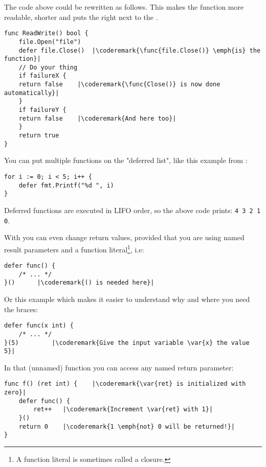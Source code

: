 The code above could be rewritten as follows. This makes the 
function more readable, shorter and puts the  right next 
to the .
\begin{lstlisting}[caption=With defer]
func ReadWrite() bool {
    file.Open("file")
    defer file.Close()	|\coderemark{\func{file.Close()} \emph{is} the function}|
    // Do your thing
    if failureX {
	return false    |\coderemark{\func{Close()} is now done automatically}|
    }
    if failureY {
	return false    |\coderemark{And here too}|
    }
    return true
}
\end{lstlisting}
You can put multiple functions on the "deferred list", like this
example from \cite{effective_go}:
\begin{lstlisting}
for i := 0; i < 5; i++ { 
    defer fmt.Printf("%d ", i) 
} 
\end{lstlisting}
Deferred functions are executed in LIFO order, so the above code
prints: \lstinline{4 3 2 1 0}. 

With  you can even change return values, provided that
you are using named result parameters and a function
literal\footnote{A function literal
is sometimes called a  closure.}, i.e:
\begin{lstlisting}[caption=Function literal]
defer func() {
	/* ... */
}()		 |\coderemark{() is needed here}|
\end{lstlisting}
Or this example which makes it easier to understand why and where
you need the braces:
\begin{lstlisting}[caption=Function literal with parameters]
defer func(x int) {
	/* ... */
}(5)		 |\coderemark{Give the input variable \var{x} the value 5}|
\end{lstlisting}
In that (unnamed) function you can access any named return
parameter:
\begin{lstlisting}[caption=Access return values within defer]
func f() (ret int) {    |\coderemark{\var{ret} is initialized with zero}|
	defer func() {
		ret++	|\coderemark{Increment \var{ret} with 1}|
	}()
	return 0	|\coderemark{1 \emph{not} 0 will be returned!}|
}
\end{lstlisting}

